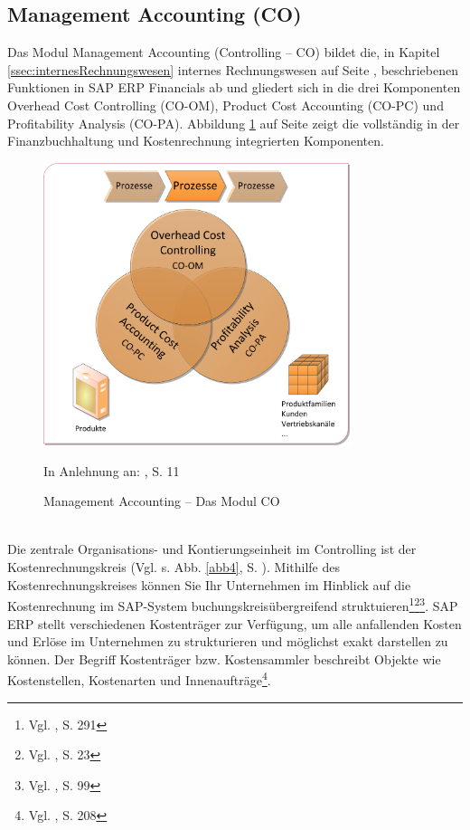 \subsection{Management Accounting (CO)} %
Das Modul Management Accounting (Controlling -- CO) bildet die, in Kapitel \ref{ssec:internesRechnungswesen} internes Rechnungswesen auf Seite \pageref{ssec:internesRechnungswesen}, beschriebenen Funktionen in SAP ERP Financials ab und gliedert sich in die drei Komponenten Overhead Cost Controlling (CO-OM), Product Cost Accounting (CO-PC) und Profitability Analysis (CO-PA). Abbildung \ref{abb3} auf Seite \pageref{abb3} zeigt die vollständig in der Finanzbuchhaltung und Kostenrechnung integrierten Komponenten. 
\begin{figure}[htbp]
\begin{center}
\includegraphics[width=0.8\textwidth]{Images/managementAccounting.png}

   {\footnotesize In Anlehnung an: \cite{SAPCOOMABC2001}, S. 11}
   \caption[Management Accounting -- Das Modul CO]{Management Accounting -- Das Modul CO}\label{abb3}
\end{center}
\end{figure}\noindent
\\Die zentrale Organisations- und Kontierungseinheit im Controlling ist der Kostenrechnungskreis (Vgl. s. Abb. \ref{abb4}, S. \pageref{abb4}). Mithilfe des Kostenrechnungskreises können Sie Ihr Unternehmen im Hinblick auf die Kostenrechnung im SAP-System buchungskreisübergreifend struktuieren\footnote{Vgl. \cite{Patel2009}, S. 291}\footnote{Vgl. \cite{Friedl2008}, S. 23}\footnote{Vgl. \cite{Klein2010}, S. 99}. SAP ERP stellt verschiedenen Kostenträger zur Verfügung, um alle anfallenden Kosten und Erlöse im Unternehmen zu strukturieren und möglichst exakt darstellen zu können. Der Begriff Kostenträger bzw. Kostensammler beschreibt Objekte wie Kostenstellen, Kostenarten und Innenaufträge\footnote{Vgl. \cite{Patel2009}, S. 208}. 
